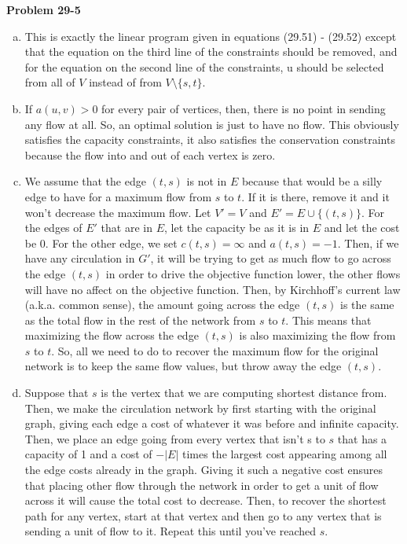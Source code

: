 \documentclass{article}
\begin{document}
\noindent\textbf{Problem 29-5}\\
\begin{enumerate}[a.]
\item
This is exactly the linear program given in equations (29.51) - (29.52) except that the equation on the third line of the constraints should be removed, and for the equation on the second line of the constraints, u should be selected from all of $V$ instead of from $V \setminus \{s,t\}$.
\item
If $a(u,v) > 0$ for every pair of vertices, then, there is no point in sending any flow at all. So, an optimal solution is just to have no flow. This obviously satisfies the capacity constraints, it also satisfies the conservation constraints because the flow into and out of each vertex is zero.
\item
We assume that the edge $(t,s)$ is not in $E$ because that would be a silly edge to have for a maximum flow from $s$ to $t$. If it is there, remove it and it won't decrease the maximum flow. Let $V' = V$ and $E' = E \cup \{(t,s)\}$. For the edges of $E'$ that are in $E$, let the capacity be as it is in $E$ and let the cost be 0. For the other edge, we set $c(t,s) = \infty$ and $a(t,s) = -1$. Then, if we have any circulation in $G'$, it will be trying to get as much flow to go across the edge $(t,s)$ in order to drive the objective function lower, the other flows will have no affect on the objective function. Then, by Kirchhoff's current law (a.k.a. common sense), the amount going across the edge $(t,s)$ is the same as the total flow in the rest of the network from $s$ to $t$. This means that maximizing the flow across the edge $(t,s)$ is also maximizing the flow from $s$ to $t$. So, all we need to do to recover the maximum flow for the original network is to keep the same flow values, but throw away the edge $(t,s)$.
\item
Suppose that $s$ is the vertex that we are computing shortest distance from. Then, we make the circulation network by first starting with the original graph, giving each edge a cost of whatever it was before and infinite capacity. Then, we place an edge going from every vertex that isn't s to $s$ that has a capacity of 1 and a cost of $-|E|$ times the largest cost appearing among all the edge costs already in the graph. Giving it such a negative cost ensures that placing other flow through the network in order to get a unit of flow across it will cause the total cost to decrease. Then, to recover the shortest path for any vertex, start at that vertex and then go to any vertex that is sending a unit of flow to it. Repeat this until you've reached $s$.
\end{enumerate}
\end{document}
